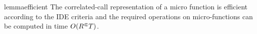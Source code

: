 \begin{restatable}{lemma}{efficient}\label{lem:efficient}
  The correlated-call representation of a micro function is efficient according to the IDE criteria and the required operations
  on micro-functions can be computed in time $O({R^\Subset} T)$.
\end{restatable}



